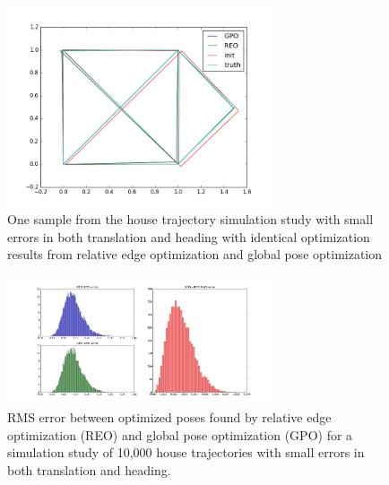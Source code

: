 \begin{figure}
  \includegraphics[width=0.7\textwidth]{figures/house_trajectory.png}
  \caption{One sample from the house trajectory simulation study with small errors in both translation and heading with identical optimization results from relative edge optimization and global pose optimization}
  \label{fig:house_trajectory}
\end{figure}

\begin{figure}[H]
  \includegraphics[width=0.7\textwidth]{figures/REO_vs_GPO_good.png}
  \caption{RMS error between optimized poses found by relative edge optimization (REO) and global pose optimization (GPO) for a simulation study of 10,000 house trajectories with small errors in both translation and heading.}
  \label{fig:convergence_house}
\end{figure}

